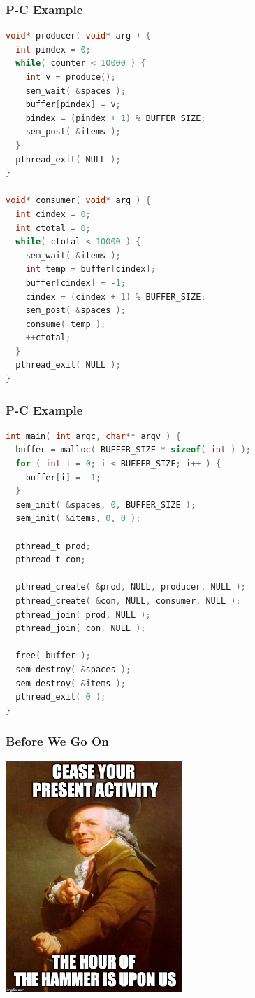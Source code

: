 \begin{frame}[fragile]
\frametitle{P-C Example}

\begin{lstlisting}[language=C]
void* producer( void* arg ) {
  int pindex = 0;
  while( counter < 10000 ) {
    int v = produce();
    sem_wait( &spaces );
    buffer[pindex] = v;
    pindex = (pindex + 1) % BUFFER_SIZE;
    sem_post( &items );
  }
  pthread_exit( NULL );
}

void* consumer( void* arg ) {
  int cindex = 0;
  int ctotal = 0;
  while( ctotal < 10000 ) {
    sem_wait( &items );
    int temp = buffer[cindex];
    buffer[cindex] = -1;
    cindex = (cindex + 1) % BUFFER_SIZE;
    sem_post( &spaces );
    consume( temp );
    ++ctotal;
  }
  pthread_exit( NULL );
}
\end{lstlisting}
\end{frame}

\begin{frame}[fragile]
\frametitle{P-C Example}

\begin{lstlisting}[language=C]
int main( int argc, char** argv ) {
  buffer = malloc( BUFFER_SIZE * sizeof( int ) );
  for ( int i = 0; i < BUFFER_SIZE; i++ ) {
    buffer[i] = -1;
  }  
  sem_init( &spaces, 0, BUFFER_SIZE );
  sem_init( &items, 0, 0 );

  pthread_t prod;
  pthread_t con;

  pthread_create( &prod, NULL, producer, NULL );
  pthread_create( &con, NULL, consumer, NULL );
  pthread_join( prod, NULL );
  pthread_join( con, NULL );

  free( buffer );
  sem_destroy( &spaces );
  sem_destroy( &items );
  pthread_exit( 0 );
}

\end{lstlisting}
\end{frame}


\begin{frame}
\frametitle{Before We Go On}

\begin{center}
	\includegraphics[width=0.5\textwidth]{images/stop-hammertime.jpg}
\end{center}

\end{frame}


